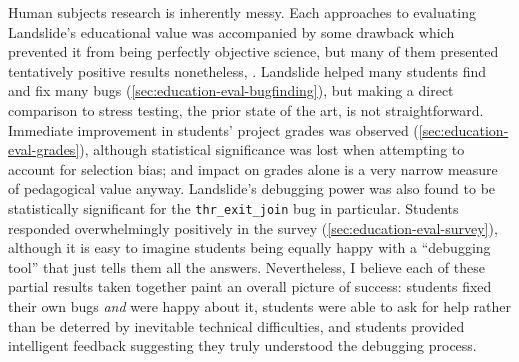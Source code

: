 Human subjects research is inherently messy.
Each %
approaches to evaluating Landslide's educational value
was accompanied by some drawback which prevented it from being perfectly objective science,
but many of them presented tentatively positive results nonetheless,
.
Landslide helped many students find and fix many bugs (\cref{sec:education-eval-bugfinding}),
but making a direct comparison to stress testing, the prior state of the art, is not straightforward.
Immediate improvement in students' project grades was observed
(\cref{sec:education-eval-grades}),
although statistical significance was lost when attempting to account for selection bias;
and impact on grades alone is a very narrow measure of pedagogical value anyway.
Landslide's debugging power was also found to be statistically significant
for the {\tt thr\_exit\_join} bug in particular.
Students responded overwhelmingly positively in the survey (\cref{sec:education-eval-survey}),
although it is easy to imagine students being equally happy with a ``debugging tool'' that just tells them all the answers.
%
Nevertheless, I believe each of these partial results taken together
paint an overall picture of success:
students fixed their own bugs {\em and} were happy about it,
students were able to ask for help rather than be deterred by inevitable technical difficulties, %
and students provided intelligent feedback suggesting they truly understood the debugging process.
